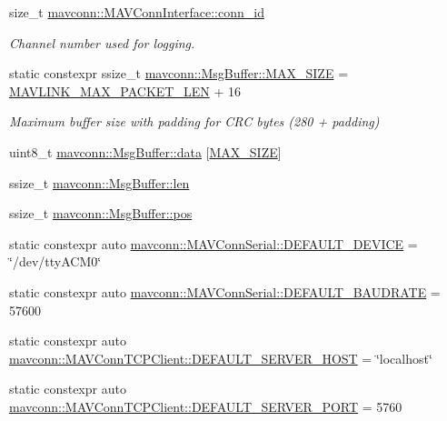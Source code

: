 \begin{DoxyCompactItemize}
size\+\_\+t \mbox{\hyperlink{group__mavconn_gab5e1164e0e16a986b4b8b07ac42149e5}{mavconn\+::\+M\+A\+V\+Conn\+Interface\+::conn\+\_\+id}}
\begin{DoxyCompactList}\small\item\em Channel number used for logging. \end{DoxyCompactList}\item 
static constexpr ssize\+\_\+t \mbox{\hyperlink{group__mavconn_ga7187a6a6dd41cfe0e92d2c59c81a0010}{mavconn\+::\+Msg\+Buffer\+::\+M\+A\+X\+\_\+\+S\+I\+ZE}} = \mbox{\hyperlink{include__v2_80_2mavlink__types_8h_a473ed646f44ca10001777e8f150508a6}{M\+A\+V\+L\+I\+N\+K\+\_\+\+M\+A\+X\+\_\+\+P\+A\+C\+K\+E\+T\+\_\+\+L\+EN}} + 16
\begin{DoxyCompactList}\small\item\em Maximum buffer size with padding for C\+RC bytes (280 + padding) \end{DoxyCompactList}\item 
uint8\+\_\+t \mbox{\hyperlink{group__mavconn_gafac3ddb58cafe6448ff6f046a73a66a5}{mavconn\+::\+Msg\+Buffer\+::data}} \mbox{[}\mbox{\hyperlink{group__mavconn_ga7187a6a6dd41cfe0e92d2c59c81a0010}{M\+A\+X\+\_\+\+S\+I\+ZE}}\mbox{]}
\item 
ssize\+\_\+t \mbox{\hyperlink{group__mavconn_ga712063584cbb6fa1ffb3cb30d0b2bd61}{mavconn\+::\+Msg\+Buffer\+::len}}
\item 
ssize\+\_\+t \mbox{\hyperlink{group__mavconn_gaf3493729d445b0f55b2ced8cfc5fa0f6}{mavconn\+::\+Msg\+Buffer\+::pos}}
\item 
static constexpr auto \mbox{\hyperlink{group__mavconn_ga3b2c35e0bfa1020060b2fde345d66f0e}{mavconn\+::\+M\+A\+V\+Conn\+Serial\+::\+D\+E\+F\+A\+U\+L\+T\+\_\+\+D\+E\+V\+I\+CE}} = \char`\"{}/dev/tty\+A\+C\+M0\char`\"{}
\item 
static constexpr auto \mbox{\hyperlink{group__mavconn_gaf0dd28c4a6b236f2ec3092a1b35ff5df}{mavconn\+::\+M\+A\+V\+Conn\+Serial\+::\+D\+E\+F\+A\+U\+L\+T\+\_\+\+B\+A\+U\+D\+R\+A\+TE}} = 57600
\item 
static constexpr auto \mbox{\hyperlink{group__mavconn_ga25f08b85aaeacae255d37a898f978c42}{mavconn\+::\+M\+A\+V\+Conn\+T\+C\+P\+Client\+::\+D\+E\+F\+A\+U\+L\+T\+\_\+\+S\+E\+R\+V\+E\+R\+\_\+\+H\+O\+ST}} = \char`\"{}localhost\char`\"{}
\item 
static constexpr auto \mbox{\hyperlink{group__mavconn_ga3d9c438ece25a8aa6ae7af15341e7706}{mavconn\+::\+M\+A\+V\+Conn\+T\+C\+P\+Client\+::\+D\+E\+F\+A\+U\+L\+T\+\_\+\+S\+E\+R\+V\+E\+R\+\_\+\+P\+O\+RT}} = 5760
\item 

\end{DoxyCompactItemize}
